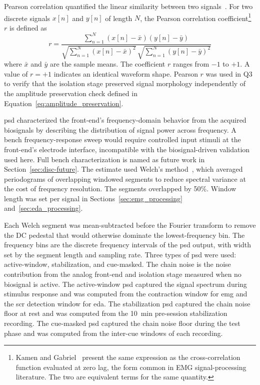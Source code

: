 Pearson correlation quantified the linear similarity between two signals~\cite{kamen_essentials_2010}. For two discrete signals $x[n]$ and $y[n]$ of length $N$, the Pearson correlation coefficient\footnote{Kamen and Gabriel~\cite{kamen_essentials_2010} present the same expression as the cross-correlation function evaluated at zero lag, the form common in EMG signal-processing literature. The two are equivalent terms for the same quantity.} $r$ is defined as
\begin{equation}
    r = \frac{\sum_{n=1}^{N}\left(x[n] - \bar{x}\right)\left(y[n] - \bar{y}\right)}{\sqrt{\sum_{n=1}^{N}\left(x[n] - \bar{x}\right)^2}\,\sqrt{\sum_{n=1}^{N}\left(y[n] - \bar{y}\right)^2}}
    \label{eq:pearson}
\end{equation}
where $\bar{x}$ and $\bar{y}$ are the sample means. The coefficient $r$ ranges from $-1$ to $+1$. A value of $r = +1$ indicates an identical waveform shape. Pearson $r$ was used in Q3 to verify that the isolation stage preserved signal morphology independently of the amplitude preservation check defined in Equation~\ref{eq:amplitude_preservation}.

\gls{psd} characterized the front-end's frequency-domain behavior from the acquired biosignals by describing the distribution of signal power across frequency. A bench frequency-response sweep would require controlled input stimuli at the front-end's electrode interface, incompatible with the biosignal-driven validation used here. Full bench characterization is named as future work in Section~\ref{sec:disc-future}. The estimate used Welch's method~\cite{kamen_essentials_2010}, which averaged periodograms of overlapping windowed segments to reduce spectral variance at the cost of frequency resolution. The segments overlapped by 50\%. Window length was set per signal in Sections~\ref{sec:emg_processing} and~\ref{sec:eda_processing}.

Each Welch segment was mean-subtracted before the Fourier transform to remove the DC pedestal that would otherwise dominate the lowest-frequency bin. The frequency bins are the discrete frequency intervals of the \gls{psd} output, with width set by the segment length and sampling rate. Three types of \gls{psd} were used: active-window, stabilization, and cue-masked. The chain noise is the noise contribution from the analog front-end and isolation stage measured when no biosignal is active. The active-window \gls{psd} captured the signal spectrum during stimulus response and was computed from the contraction window for \gls{emg} and the \gls{scr} detection window for \gls{eda}. The stabilization \gls{psd} captured the chain noise floor at rest and was computed from the \SI{10}{\minute} pre-session stabilization recording. The cue-masked \gls{psd} captured the chain noise floor during the test phase and was computed from the inter-cue windows of each recording.

